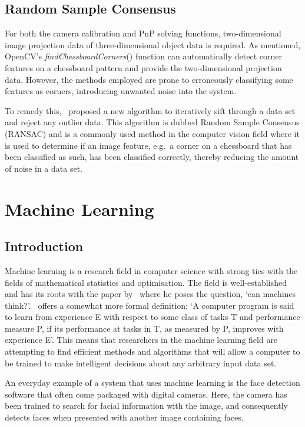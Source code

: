 \subsection{Random Sample Consensus}

For both the camera calibration and PnP solving functions, two-dimensional image projection data of three-dimensional object data is required. As mentioned, OpenCV's \emph{findChessboardCorners}() function can automatically detect corner features on a chessboard pattern and provide the two-dimensional projection data. However, the methods employed are prone to erroneously classifying some features as corners, introducing unwanted noise into the system. 

To remedy this,~\cite{fischler1981random} proposed a new algorithm to iteratively sift through a data set and reject any outlier data. This algorithm is dubbed Random Sample Consensus (RANSAC) and is a commonly used method in the computer vision field where it is used to determine if an image feature, e.g.\ a corner on a chessboard that has been classified as such, has been classified correctly, thereby reducing the amount of noise in a data set. 

\section{Machine Learning}

\subsection{Introduction}

Machine learning is a research field in computer science with strong ties with the fields of mathematical statistics and optimisation. The field is well-established and has its roots with the paper by~\cite{turing1950computing} where he poses the question, `can machines think?'.~\cite{michalski2013machine} offers a somewhat more formal definition: `A computer program is said to learn from experience E with respect to some class of tasks T and performance measure P, if its performance at tasks in T, as measured by P, improves with experience E'. This means that researchers in the machine learning field are attempting to find efficient methods and algorithms that will allow a computer to be trained to make intelligent decisions about any arbitrary input data set. 

An everyday example of a system that uses machine learning is the face detection software that often come packaged with digital cameras. Here, the camera has been trained to search for facial information with the image, and consequently detects faces when presented with another image containing faces.


